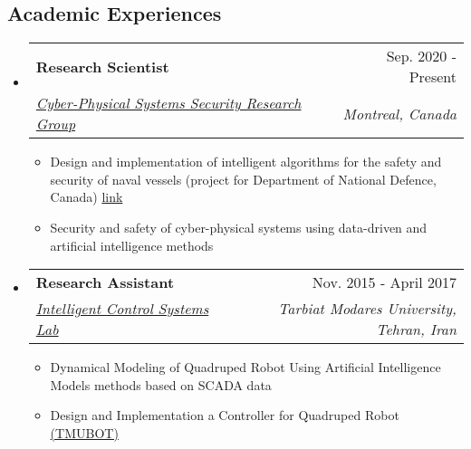 \documentclass[letterpaper,10.8pt]{article}
\makeatletter
\newcommand{\resumeSubheading}[4]{
  \vspace{-1pt}\item
    \begin{tabular*}{0.97\textwidth}{l@{\extracolsep{\fill}}r}
      \textbf{#1} & #2 \\
      \textit{\small#3} & \textit{\small #4} \\
    \end{tabular*}\vspace{-5pt}
}
\newcommand{\resumeSubHeadingListStart}{\begin{itemize}[leftmargin=*]}
\newcommand{\resumeSubHeadingListEnd}{\end{itemize}}
\makeatother
\begin{document}
\subsection*{Academic Experiences}
    \resumeSubHeadingListStart
    \resumeSubheading
      {Research Scientist}{Sep. 2020 - Present}
      {\href{https://users.encs.concordia.ca/~wlucia/Group.html}{Cyber-Physical Systems Security Research Group}}{Montreal, Canada}
	   {\small
	   \begin{itemize}
     \item Design and implementation of  intelligent algorithms for the safety and security of naval vessels (project for Department of National Defence, Canada) \href{https://www.concordia.ca/news/stories/2022/11/21/the-department-of-national-defence-awards-concordia-researcher-1-m-to-develop-new-strategies-against-cyberattacks.html}{link}
	       \item Security and safety of cyber-physical systems using data-driven and artificial intelligence methods
	      
	 \end{itemize}
	   }
	   \resumeSubheading
      {Research Assistant}{Nov. 2015 - April 2017}
      {\href{https://www.modares.ac.ir/~majd}{Intelligent Control Systems Lab}}{Tarbiat Modares University, Tehran, Iran}
	   {\small
	   \begin{itemize}
	       \item Dynamical Modeling of Quadruped Robot Using Artificial Intelligence Models methods based on SCADA data
%
\item Design and Implementation a Controller for Quadruped Robot \href{https://www.researchgate.net/publication/315684334_Estimation_of_external_forces_acting_on_the_legs_of_a_quadruped_robot_using_two_nonlinear_disturbance_observers}{(TMUBOT)}
	   \end{itemize}}
	   
 \resumeSubHeadingListEnd
 
 
\end{document}
